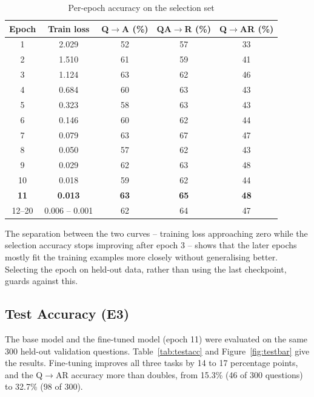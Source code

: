 \documentclass[12pt,a4paper,oneside]{report}
\newcommand{\QtoA}{Q$\rightarrow$A}
\newcommand{\QAtoR}{QA$\rightarrow$R}
\newcommand{\QtoAR}{Q$\rightarrow$AR}
\begin{document}
\begin{table}[htbp]
\centering
\caption{Per-epoch accuracy on the selection set}
\label{tab:epochs}
\small
\begin{tabular}{@{}ccccc@{}}
\toprule
\textbf{Epoch} & \textbf{Train loss} & \textbf{\QtoA{} (\%)} & \textbf{\QAtoR{} (\%)} & \textbf{\QtoAR{} (\%)}\\
\midrule
1 & 2.029 & 52 & 57 & 33\\
2 & 1.510 & 61 & 59 & 41\\
3 & 1.124 & 63 & 62 & 46\\
4 & 0.684 & 60 & 63 & 43\\
5 & 0.323 & 58 & 63 & 43\\
6 & 0.146 & 60 & 62 & 44\\
7 & 0.079 & 63 & 67 & 47\\
8 & 0.050 & 57 & 62 & 43\\
9 & 0.029 & 62 & 63 & 48\\
10 & 0.018 & 59 & 62 & 44\\
\rowcolor{phaseone}\textbf{11} & \textbf{0.013} & \textbf{63} & \textbf{65} & \textbf{48}\\
12--20 & 0.006 -- 0.001 & 62 & 64 & 47\\
\bottomrule
\end{tabular}
\end{table}

The separation between the two curves -- training loss approaching zero while
the selection accuracy stops improving after epoch 3 -- shows that the later
epochs mostly fit the training examples more closely without generalising
better. Selecting the epoch on held-out data, rather than using the last
checkpoint, guards against this.

\subsection{Test Accuracy (E3)}

The base model and the fine-tuned model (epoch 11) were evaluated on the same
300 held-out validation questions. Table~\ref{tab:testacc} and
Figure~\ref{fig:testbar} give the results. Fine-tuning improves all three tasks
by 14 to 17 percentage points, and the \QtoAR{} accuracy more than doubles, from
15.3\% (46 of 300 questions) to 32.7\% (98 of 300).
\end{document}
